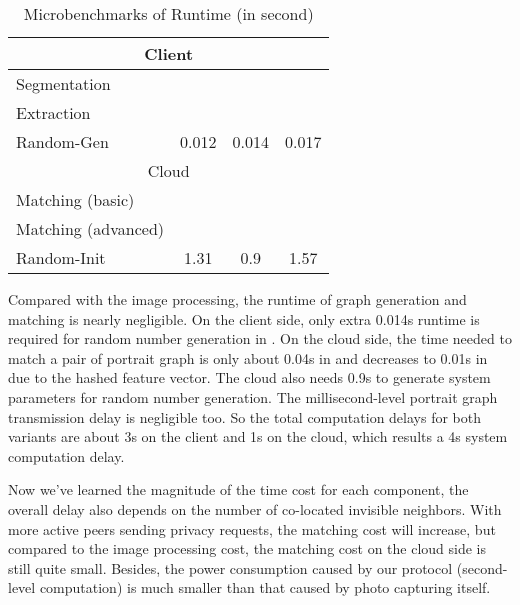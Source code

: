 \begin{table}[hp]
\vspace{-0.08in}
\caption{Microbenchmarks of Runtime (in second)}
\label{table:time}
\centering
{\footnotesize
\begin{tabular}{|l|c|c|c|}
\hline
\multicolumn{4}{|c|}{Client}\\
\hline
Segmentation &  &  & \\
\hline
Extraction &  &  & \\
\hline
Random-Gen & 0.012 & 0.014 & 0.017 \\
\hline
\multicolumn{4}{|c|}{Cloud}\\
\hline
Matching (basic) &  &  & \\
\hline
Matching (advanced) &  &  & \\
\hline
Random-Init &  1.31 & 0.9 & 1.57 \\
\hline
\end{tabular}}
\vspace{-0.1in}
\end{table}

Compared with the image processing, the runtime of graph generation and matching is nearly negligible.
On the client side, only extra 0.014s runtime is required for random number generation in
 \advanced. On the cloud side, the time needed to match a pair of portrait graph
 is only about 0.04s in \basic and decreases to 0.01s in \advanced due to the hashed feature vector.
The cloud also needs 0.9s to generate system parameters for random number generation.
The millisecond-level portrait graph transmission delay is negligible too.
So the total computation delays for both variants are about 3s on the client
 and 1s on the cloud, which results a 4s system computation delay.


Now we've learned the magnitude of the time cost for each component,
 the overall delay also depends on the number of co-located invisible neighbors.
With more active peers sending privacy requests, the matching cost will increase,
 but compared to the image processing cost, the matching cost on the cloud side is still quite small.
Besides, the power consumption caused by our protocol (second-level computation) is much smaller than that caused by photo capturing itself.






















